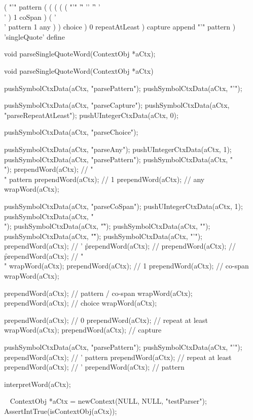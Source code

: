 \starttyping
(
  "'" pattern
  (
    ( 
      (
        ( ( "'" '\r' '\n' '\f' '\\' ) 1 coSpan )
        ( '\\' pattern 1 any )
      ) choice
    ) 0 repeatAtLeast
  ) capture append
  "'" pattern
) 'singleQuote' define
\stoptyping

\startCHeader
void parseSingleQuoteWord(ContextObj *aCtx);
\stopCHeader

\startCCode
void parseSingleQuoteWord(ContextObj *aCtx) {

  pushSymbolCtxData(aCtx, "parsePattern");
  pushSymbolCtxData(aCtx, "'");

  pushSymbolCtxData(aCtx, "parseCapture");
  pushSymbolCtxData(aCtx, "parseRepeatAtLeast");
  pushUIntegerCtxData(aCtx, 0);

  pushSymbolCtxData(aCtx, "parseChoice");

  pushSymbolCtxData(aCtx, "parseAny");
  pushUIntegerCtxData(aCtx, 1);
  pushSymbolCtxData(aCtx, "parsePattern");
  pushSymbolCtxData(aCtx, "\\");
  prependWord(aCtx);  // "\\" pattern
  prependWord(aCtx);  // 1
  prependWord(aCtx);  // any
  wrapWord(aCtx);

  pushSymbolCtxData(aCtx, "parseCoSpan");
  pushUIntegerCtxData(aCtx, 1);
  pushSymbolCtxData(aCtx, "\\");
  pushSymbolCtxData(aCtx, "\f");
  pushSymbolCtxData(aCtx, "\n");
  pushSymbolCtxData(aCtx, "\r");
  pushSymbolCtxData(aCtx, "'");
  prependWord(aCtx);  // ' \r
  prependWord(aCtx);  // \n
  prependWord(aCtx);  // \f
  prependWord(aCtx);  // "\\"
  wrapWord(aCtx);
  prependWord(aCtx);  // 1
  prependWord(aCtx);  // co-span
  wrapWord(aCtx);
  
  prependWord(aCtx);  // pattern / co-span
  wrapWord(aCtx);
  prependWord(aCtx);  // choice
  wrapWord(aCtx);
  
  prependWord(aCtx);  // 0
  prependWord(aCtx);  // repeat at least
  wrapWord(aCtx);
  prependWord(aCtx);  // capture
  
  pushSymbolCtxData(aCtx, "parsePattern");
  pushSymbolCtxData(aCtx, "'");
  prependWord(aCtx);  // ' pattern
  prependWord(aCtx);  // repeat at least
  prependWord(aCtx);  // '
  prependWord(aCtx);  // pattern

  interpretWord(aCtx);
}
\stopCCode

\CTestsSuiteSetup\
\startCTest
  ContextObj *aCtx = newContext(NULL, NULL, "testParser");
  AssertIntTrue(isContextObj(aCtx));
  

